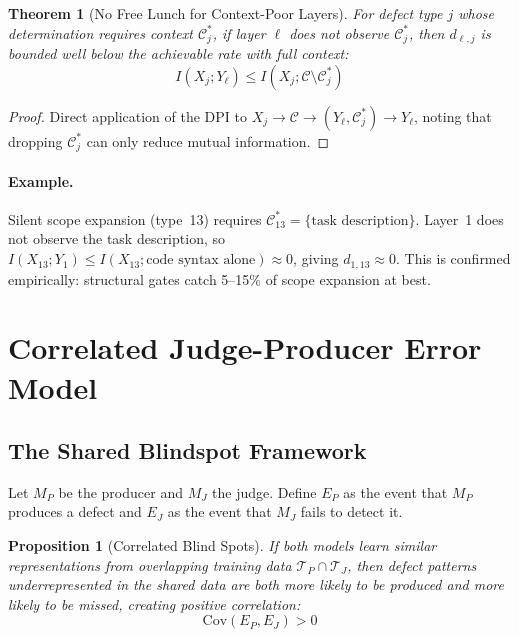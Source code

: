\documentclass[11pt, a4paper, logo, copyright]{googledeepmind}
\newtheorem{theorem}{Theorem}[section]
\newtheorem{proposition}{Proposition}[section]
\begin{document}
\begin{theorem}[No Free Lunch for Context-Poor Layers]
\label{thm:nofreelunch}
For defect type $j$ whose determination requires context $\mathcal{C}_j^*$, if layer $\ell$ does not observe $\mathcal{C}_j^*$, then $d_{\ell,j}$ is bounded well below the achievable rate with full context:
\begin{equation}
I(X_j; Y_\ell) \leq I(X_j; \mathcal{C} \setminus \mathcal{C}_j^*)
\end{equation}
\end{theorem}

\begin{proof}
Direct application of the DPI to $X_j \to \mathcal{C} \to (Y_\ell, \mathcal{C}_j^*) \to Y_\ell$, noting that dropping $\mathcal{C}_j^*$ can only reduce mutual information.
\end{proof}

\paragraph{Example.} Silent scope expansion (type~13) requires $\mathcal{C}_{13}^* = \{\text{task description}\}$. Layer~1 does not observe the task description, so $I(X_{13}; Y_1) \leq I(X_{13}; \text{code syntax alone}) \approx 0$, giving $d_{1,13} \approx 0$. This is confirmed empirically: structural gates catch 5--15\% of scope expansion at best.


\section{Correlated Judge-Producer Error Model}
\label{sec:correlation}

\subsection{The Shared Blindspot Framework}

Let $M_P$ be the producer and $M_J$ the judge. Define $E_P$ as the event that $M_P$ produces a defect and $E_J$ as the event that $M_J$ fails to detect it.

\begin{proposition}[Correlated Blind Spots]
\label{prop:correlated}
If both models learn similar representations from overlapping training data $\mathcal{T}_P \cap \mathcal{T}_J$, then defect patterns underrepresented in the shared data are both more likely to be produced and more likely to be missed, creating positive correlation:
\begin{equation}
\mathrm{Cov}(E_P, E_J) > 0
\end{equation}
\end{proposition}
\end{document}
